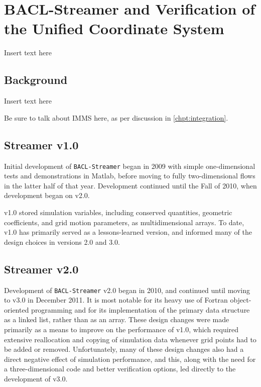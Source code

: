 \chapter{BACL-Streamer and Verification of the Unified Coordinate System}
\label{chpt:ver}

Insert text here

\section{Background}
\label{sec:ver-background}

Insert text here

Be sure to talk about IMMS here, as per discussion in \ref{chpt:integration}.

\section{Streamer v1.0}

Initial development of {\tt BACL-Streamer} began in 2009 with simple one-dimensional tests and demonstrations in Matlab, before moving to fully two-dimensional flows in the latter half of that year. Development continued until the Fall of 2010, when development began on v2.0.

v1.0 stored simulation variables, including conserved quantities, geometric coefficients, and grid motion parameters, as multidimensional arrays. To date, v1.0 has primarily served as a lessons-learned version, and informed many of the design choices in versions 2.0 and 3.0. 

\section{Streamer v2.0}
\label{sec:ver-Streamer2}

Development of {\tt BACL-Streamer} v2.0 began in 2010, and continued until moving to v3.0 in December 2011. It is most notable for its heavy use of Fortran object-oriented programming and for its implementation of the primary data structure as a linked list, rather than as an array. These design changes were made primarily as a means to improve on the performance of v1.0, which required extensive reallocation and copying of simulation data whenever grid points had to be added or removed. Unfortunately, many of these design changes also had a direct negative effect of simulation performance, and this, along with the need for a three-dimensional code and better verification options, led directly to the development of v3.0.


